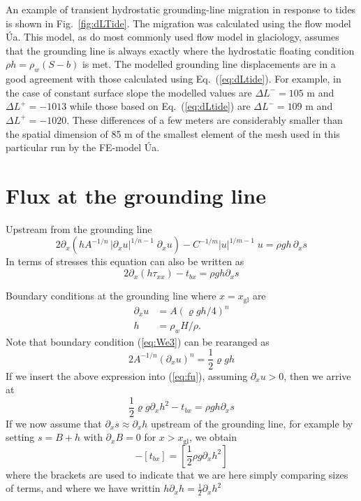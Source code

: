 \documentclass[10pt,a4paper]{book}
\newcommand{\p}{\partial}
\newcommand{\txx}{\tau_{xx}}
\newcommand{\xgl}{x_{\mathrm{gl}}}
\begin{document}
An example of transient hydrostatic grounding-line migration in
response to tides is shown in Fig.~\ref{fig:dLTide}. The migration was
calculated using the flow model \'Ua. This model, as do most commonly
used flow model in glaciology, assumes that the grounding line is
always exactly where the hydrostatic floating condition $\rho h=\rho_w
(S-b)$ is met. The modelled grounding line displacements are in a good
agreement with those calculated using Eq.~(\ref{eq:dLtide}). For
example, in the case of constant surface slope the modelled values are
$\Delta L^{-}=105$ m and $\Delta L^{+}=-1013$ while those based on
Eq.~(\ref{eq:dLtide}) are $\Delta L^{-}=109$ m and $\Delta
L^{+}=-1020$. These differences of a few meters are considerably
smaller than the spatial dimension of 85 m of the smallest element of
the mesh used in this particular run by the FE-model \'Ua.





\section{Flux at the grounding line}
\label{sec:FGL}

Upstream from the grounding line
\begin{equation}
  2 \p_x \left (h A^{-1/n} \, | \p_x u|^{1/n-1} \; \p_x u \right ) - C^{-1/m} |u|^{1/m-1} \; u = \rho g h \, \p_x s
\label{eq:fu}
\end{equation}
In terms of stresses this equation can also be written as
\begin{equation}
  2 \p_x (h \txx) -t_{bx}= \rho g h \p_x s
\label{eq:fs}
\end{equation}


Boundary conditions at the grounding line where $x=\xgl$ are
\begin{align}
\p_x u &= A (\varrho g h/4)^n  \label{eq:We3} \\
     h&=\rho_w H /\rho . \label{eq:fc}
\end{align}
Note that boundary condition (\ref{eq:We3}) can be rearanged as
\[
2 A^{-1/n} (\p_x u)^n = \frac{1}{2} \varrho g h
\]
If we insert the above expression into (\ref{eq:fu}), assuming $\p_x u > 0$, then we arrive at
\[
\frac{1}{2}\varrho g \p_x h^2  - t_{bx} = \rho g h \p_x s
\]
If we now assume that $\p_x s \approx \p_x h$ upstream of the
grounding line, for example by setting $s=B+h$ with $\p_x B=0$ for $x>\xgl$, we
obtain
\begin{equation}
[\frac{1}{2} \varrho g \p_x h^2] - [t_{bx}] = [\frac{1}{2} \rho g \p_x h^2]
\label{eq:ghp}
\end{equation}
where the brackets are used to indicate that we are here simply
comparing sizes of terms, and where we have writtin $ h \p_x h = \frac{1}{2} \p_x h^2 $
\end{document}
